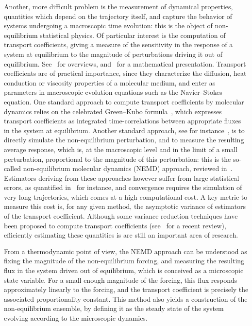 Another, more difficult problem is the measurement of dynamical properties, quantities which depend on the trajectory itself, and capture the behavior of systems undergoing a macroscopic time evolution: this is the object of non-equilibrium statistical physics.
Of particular interest is the computation of transport coefficients, giving a measure of the sensitivity in the response of a system at equilibrium to the magnitude of perturbations driving it out of equilibrium. See~\cite{EM08,TD17} for overviews, and~\cite[Section 5]{LS16} for a mathematical presentation.
Transport coefficients are of practical importance, since they characterize the diffusion, heat conduction or viscosity properties of a molecular medium, and enter as parameters in macroscopic evolution equations such as the Navier--Stokes equation.
One standard approach to compute transport coefficients by molecular dynamics relies on the celebrated Green--Kubo formula~\cite{G54}, which expresses transport coefficients as integrated time-correlations between appropriate fluxes in the system at equilibrium. Another standard approach, see for instance~\cite{CJ75}, is to directly simulate the non-equilibrium perturbation, and to measure the resulting average response, which is, at the macroscopic level and in the limit of a small perturbation, proportional to the magnitude of this perturbation: this is the so-called non-equilibrium molecular dynamics (NEMD) approach, reviewed in~\cite{CKS05}. Estimators deriving from these approaches however suffer from large statistical errors, as quantified in~\cite[Proposition 2.4]{SS23} for instance, and convergence requires the simulation of very long trajectories, which comes at a high computational cost. A key metric to measure this cost is, for any given method, the asymptotic variance of estimators of the transport coefficient. Although some variance reduction techniques have been proposed to compute transport coefficients (see~\cite{S22} for a recent review), efficiently estimating these quantities is are still an important area of research.

From a thermodynamic point of view, the NEMD approach can be understood as fixing the magnitude of the non-equilibrium forcing, and measuring the resulting flux in the system driven out of equilibrium, which is conceived as a microscopic state variable. For a small enough magnitude of the forcing, this flux responds approximately linearly to the forcing, and the transport coefficient is precisely the associated proportionality constant. This method also yields a construction of the non-equilibrium ensemble, by defining it as the steady state of the system evolving according to the microscopic dynamics.

